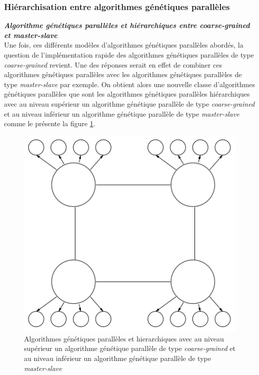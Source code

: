 	\subsubsection{Hiérarchisation entre algorithmes génétiques parallèles}{\label{sec:algo_hierarchique}}
	
	\textsl{\textbf{Algorithme génétiques parallèles et hiérarchiques entre \emph{coarse-grained} et \emph{master-slave}}}\\
	
	\hspace*{.5cm} Une fois, ces différents modèles d'algorithmes génétiques parallèles abordés, la question de l'implémentation rapide des algorithmes génétiques parallèles de type \emph{coarse-grained }revient. Une des réponses serait en effet de combiner ces algorithmes génétiques parallèles avec les algorithmes génétiques parallèles de type \emph{master-slave} par exemple. On obtient alors une nouvelle classe d'algorithmes génétiques parallèles que sont les algorithmes génétiques parallèles hiérarchiques\cite{cant2} avec au niveau supérieur un algorithme génétique parallèle de type \emph{coarse-grained} et au niveau inférieur un algorithme génétique parallèle de type \emph{master-slave} comme le présente la figure \ref{fig:hierarchical_gene1_fig}. \\
 	
	\begin{figure}[!h]
		\begin{center}
			\includegraphics[scale=.3]{images/hierarchical_gene1_fig.png}
			\caption{Algorithmes génétiques parallèles et hierarchiques avec au niveau supérieur un algorithme génétique parallèle de type \emph{coarse-grained} et au niveau inférieur un algorithme génétique parallèle de type \emph{master-slave} \cite{cant2}}
			\label{fig:hierarchical_gene1_fig}
		\end{center}
	\end{figure} 	
	
